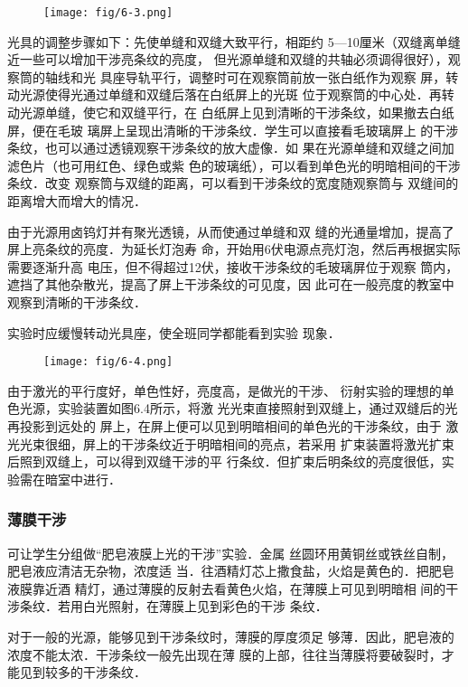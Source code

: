 \begin{figure}[htp]
    \centering
    \texttt{[image: fig/6-3.png]}
    \caption{}
\end{figure}

光具的调整步骤如下：先使单缝和双缝大致平行，相距约
5—10厘米（双缝离单缝近一些可以增加干涉亮条纹的亮度，
但光源单缝和双缝的共轴必须调得很好），观察筒的轴线和光
具座导轨平行，调整时可在观察筒前放一张白纸作为观察
屏，转动光源使得光通过单缝和双缝后落在白纸屏上的光斑
位于观察筒的中心处．再转动光源单缝，使它和双缝平行，在
白纸屏上见到清晰的干涉条纹，如果撤去白纸屏，便在毛玻
璃屏上呈现出清晰的干涉条纹．学生可以直接看毛玻璃屏上
的干涉条纹，也可以通过透镜观察干涉条纹的放大虚像．如
果在光源单缝和双缝之间加滤色片（也可用红色、绿色或紫
色的玻璃纸），可以看到单色光的明暗相间的干涉条纹．改变
观察筒与双缝的距离，可以看到干涉条纹的宽度随观察筒与
双缝间的距离增大而增大的情况．

由于光源用卤钨灯并有聚光透镜，从而使通过单缝和双
缝的光通量增加，提高了屏上亮条纹的亮度．为延长灯泡寿
命，开始用6伏电源点亮灯泡，然后再根据实际需要逐渐升高
电压，但不得超过12伏，接收干涉条纹的毛玻璃屏位于观察
筒内，遮挡了其他杂散光，提高了屏上干涉条纹的可见度，因
此可在一般亮度的教室中观察到清晰的干涉条纹．

实验时应缓慢转动光具座，使全班同学都能看到实验
现象．

\begin{figure}[htp]
    \centering
    \texttt{[image: fig/6-4.png]}
    \caption{}
\end{figure}

由于激光的平行度好，单色性好，亮度高，是做光的干涉、
衍射实验的理想的单色光源，实验装置如图6.4所示，将激
光光束直接照射到双缝上，通过双缝后的光再投影到远处的
屏上，在屏上便可以见到明暗相间的单色光的干涉条纹，由于
激光光束很细，屏上的干涉条纹近于明暗相间的亮点，若采用
扩束装置将激光扩束后照到双缝上，可以得到双缝干涉的平
行条纹．但扩束后明条纹的亮度很低，实验需在暗室中进行．

\subsubsection{薄膜干涉}

可让学生分组做“肥皂液膜上光的干涉”实验．金属
丝圆环用黄铜丝或铁丝自制，肥皂液应清洁无杂物，浓度适
当．往酒精灯芯上撒食盐，火焰是黄色的．把肥皂液膜靠近酒
精灯，通过薄膜的反射去看黄色火焰，在薄膜上可见到明暗相
间的干涉条纹．若用白光照射，在薄膜上见到彩色的干涉
条纹．

对于一般的光源，能够见到干涉条纹时，薄膜的厚度须足
够薄．因此，肥皂液的浓度不能太浓．干涉条纹一般先出现在薄
膜的上部，往往当薄膜将要破裂时，才能见到较多的干涉条纹．

